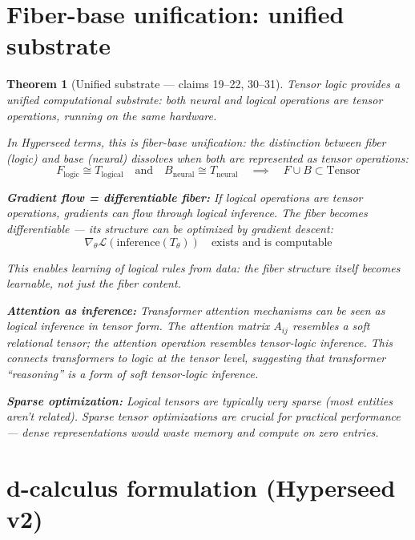 \documentclass[11pt,a4paper]{article}
\newtheorem{theorem}[definition]{Theorem}
\begin{document}
\section{Fiber-base unification: unified substrate}
\label{sec:unification}

\begin{theorem}[Unified substrate --- claims 19--22, 30--31]
\label{thm:unified}
Tensor logic provides a \emph{unified computational substrate}: both neural
and logical operations are tensor operations, running on the same hardware.

In Hyperseed terms, this is \emph{fiber-base unification}: the distinction
between fiber (logic) and base (neural) dissolves when both are represented
as tensor operations:
\[
  F_{\text{logic}} \cong T_{\text{logical}} \quad \text{and} \quad
  B_{\text{neural}} \cong T_{\text{neural}} \quad \implies \quad
  F \cup B \subset \text{Tensor}
\]

\textbf{Gradient flow = differentiable fiber:} If logical operations are
tensor operations, gradients can flow through logical inference. The fiber
becomes differentiable --- its structure can be optimized by gradient descent:
\[
  \nabla_\theta \mathcal{L}(\text{inference}(T_\theta))
  \quad \text{exists and is computable}
\]

This enables learning of logical rules from data: the fiber structure
itself becomes learnable, not just the fiber content.

\textbf{Attention as inference:} Transformer attention mechanisms can be
seen as logical inference in tensor form. The attention matrix $A_{ij}$
resembles a soft relational tensor; the attention operation resembles
tensor-logic inference. This connects transformers to logic at the
tensor level, suggesting that transformer ``reasoning'' is a form of
soft tensor-logic inference.

\textbf{Sparse optimization:} Logical tensors are typically very sparse
(most entities aren't related). Sparse tensor optimizations are crucial
for practical performance --- dense representations would waste memory
and compute on zero entries.
\end{theorem}

\section{d-calculus formulation (Hyperseed v2)}
\label{sec:v2}
\end{document}
